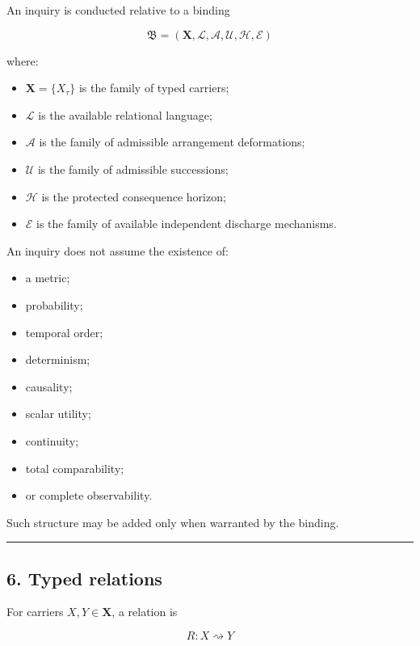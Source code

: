 \documentclass[
]{article}
\providecommand{\tightlist}{%
  \setlength{\itemsep}{0pt}\setlength{\parskip}{0pt}}
\begin{document}
An inquiry is conducted relative to a binding

\[
\boxed{
\mathfrak B
=
(\mathbf X,\mathcal L,\mathcal A,\mathcal U,\mathcal H,\mathcal E)
}
\]

where:

\begin{itemize}
\tightlist
\item
  \(\mathbf X=\{X_\tau\}\) is the family of typed carriers;
\item
  \(\mathcal L\) is the available relational language;
\item
  \(\mathcal A\) is the family of admissible arrangement deformations;
\item
  \(\mathcal U\) is the family of admissible successions;
\item
  \(\mathcal H\) is the protected consequence horizon;
\item
  \(\mathcal E\) is the family of available independent discharge
  mechanisms.
\end{itemize}

An inquiry does not assume the existence of:

\begin{itemize}
\tightlist
\item
  a metric;
\item
  probability;
\item
  temporal order;
\item
  determinism;
\item
  causality;
\item
  scalar utility;
\item
  continuity;
\item
  total comparability;
\item
  or complete observability.
\end{itemize}

Such structure may be added only when warranted by the binding.

\begin{center}\rule{0.5\linewidth}{0.5pt}\end{center}

\subsection{6. Typed relations}\label{typed-relations}

For carriers \(X,Y\in\mathbf X\), a relation is

\[
R:X\rightsquigarrow Y
\]
\end{document}
